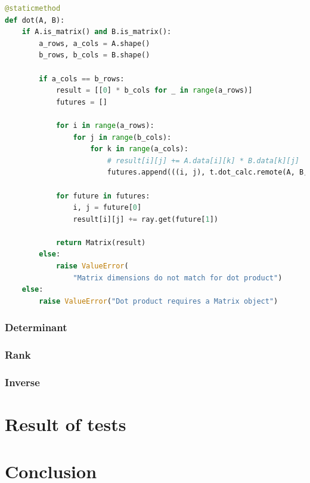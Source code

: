 \begin{lstlisting}[language=Python, caption={Parallelized dot function}]
@staticmethod
def dot(A, B):
    if A.is_matrix() and B.is_matrix():
        a_rows, a_cols = A.shape()
        b_rows, b_cols = B.shape()

        if a_cols == b_rows:
            result = [[0] * b_cols for _ in range(a_rows)]
            futures = []

            for i in range(a_rows):
                for j in range(b_cols):
                    for k in range(a_cols):
                        # result[i][j] += A.data[i][k] * B.data[k][j]
                        futures.append(((i, j), t.dot_calc.remote(A, B, i, j, k)))
            
            for future in futures:
                i, j = future[0]
                result[i][j] += ray.get(future[1])

            return Matrix(result)
        else:
            raise ValueError(
                "Matrix dimensions do not match for dot product")
    else:
        raise ValueError("Dot product requires a Matrix object")
\end{lstlisting}

\subsubsection{Determinant}
\subsubsection{Rank}
\subsubsection{Inverse}
\pagebreak
\section{Result of tests}


\section{Conclusion}

